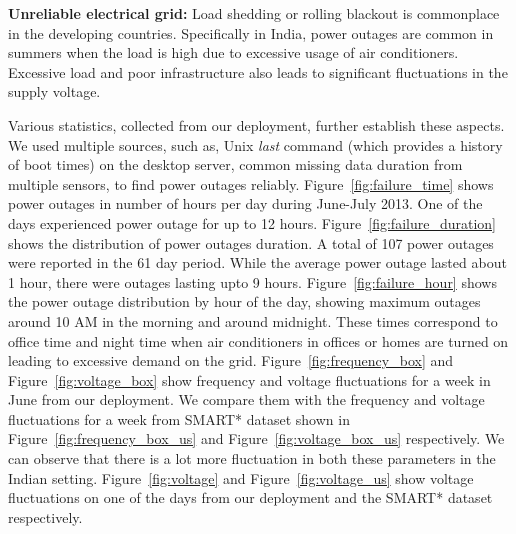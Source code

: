 \documentclass[10pt]{sensys-proc}
\newcommand{\figref}[1]{Figure~\ref{#1}}
\begin{document}
\noindent \textbf{Unreliable electrical grid:} Load shedding or rolling blackout is commonplace in the developing countries. %
Specifically in India, power outages are common in summers when the load is high due to excessive usage of air conditioners. Excessive load and poor infrastructure also leads to significant fluctuations in the supply voltage. %

Various statistics, collected from our deployment, further establish these aspects. We used multiple sources, such as, Unix \emph{last} command (which provides a history of boot times) on the desktop server, common missing data duration from multiple sensors, to find power outages reliably. \figref{fig:failure_time} shows power outages in number of hours per day during June-July 2013. One of the days experienced power outage for up to 12 hours. 
 \figref{fig:failure_duration} shows the distribution of power outages duration. A total of 107 power outages were reported in the 61 day period. While the average power outage lasted about 1 hour, there were outages lasting upto 9 hours. \figref{fig:failure_hour} shows the power outage distribution by hour of the day, showing maximum outages around 10 AM in the morning and around midnight. These times correspond to office time and night time when air conditioners in offices or homes are turned on leading to excessive demand on the grid. \figref{fig:frequency_box} and \figref{fig:voltage_box} show frequency and voltage fluctuations for a week in June from our deployment. We compare them with the frequency and voltage fluctuations for a week from SMART* dataset shown in \figref{fig:frequency_box_us} and \figref{fig:voltage_box_us} respectively. We can observe that there is a lot more fluctuation in both these parameters in the Indian setting. \figref{fig:voltage} and \figref{fig:voltage_us}  show voltage fluctuations on one of the days from our deployment and the SMART* dataset respectively. 
\end{document}
